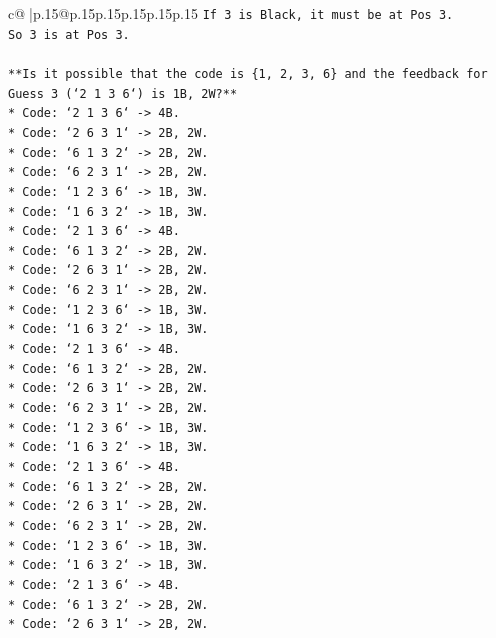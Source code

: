 \documentclass{article}
\begin{document}
{\begin{supertabular}{c@{$\;$}|p{.15\linewidth}@{}p{.15\linewidth}p{.15\linewidth}p{.15\linewidth}p{.15\linewidth}p{.15\linewidth}}
{{{\texttt{If 3 is Black, it must be at Pos 3.} \\
\texttt{So 3 is at Pos 3.} \\
\\ 
\texttt{**Is it possible that the code is \{1, 2, 3, 6\} and the feedback for Guess 3 (`2 1 3 6`) is 1B, 2W?**} \\
\texttt{*   Code: `2 1 3 6` {-}> 4B.} \\
\texttt{*   Code: `2 6 3 1` {-}> 2B, 2W.} \\
\texttt{*   Code: `6 1 3 2` {-}> 2B, 2W.} \\
\texttt{*   Code: `6 2 3 1` {-}> 2B, 2W.} \\
\texttt{*   Code: `1 2 3 6` {-}> 1B, 3W.} \\
\texttt{*   Code: `1 6 3 2` {-}> 1B, 3W.} \\
\texttt{*   Code: `2 1 3 6` {-}> 4B.} \\
\texttt{*   Code: `6 1 3 2` {-}> 2B, 2W.} \\
\texttt{*   Code: `2 6 3 1` {-}> 2B, 2W.} \\
\texttt{*   Code: `6 2 3 1` {-}> 2B, 2W.} \\
\texttt{*   Code: `1 2 3 6` {-}> 1B, 3W.} \\
\texttt{*   Code: `1 6 3 2` {-}> 1B, 3W.} \\
\texttt{*   Code: `2 1 3 6` {-}> 4B.} \\
\texttt{*   Code: `6 1 3 2` {-}> 2B, 2W.} \\
\texttt{*   Code: `2 6 3 1` {-}> 2B, 2W.} \\
\texttt{*   Code: `6 2 3 1` {-}> 2B, 2W.} \\
\texttt{*   Code: `1 2 3 6` {-}> 1B, 3W.} \\
\texttt{*   Code: `1 6 3 2` {-}> 1B, 3W.} \\
\texttt{*   Code: `2 1 3 6` {-}> 4B.} \\
\texttt{*   Code: `6 1 3 2` {-}> 2B, 2W.} \\
\texttt{*   Code: `2 6 3 1` {-}> 2B, 2W.} \\
\texttt{*   Code: `6 2 3 1` {-}> 2B, 2W.} \\
\texttt{*   Code: `1 2 3 6` {-}> 1B, 3W.} \\
\texttt{*   Code: `1 6 3 2` {-}> 1B, 3W.} \\
\texttt{*   Code: `2 1 3 6` {-}> 4B.} \\
\texttt{*   Code: `6 1 3 2` {-}> 2B, 2W.} \\
\texttt{*   Code: `2 6 3 1` {-}> 2B, 2W.} \\
}}}
\end{supertabular}}
\end{document}
